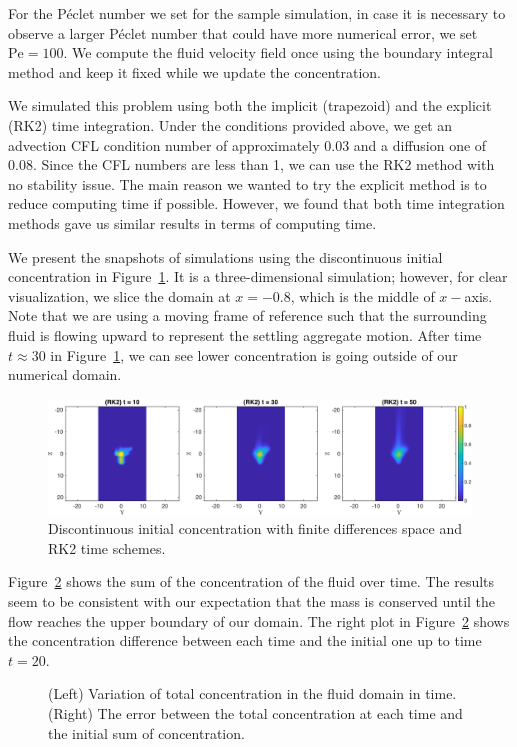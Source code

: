 For the Péclet number we set for the sample simulation, in case it is necessary to observe a larger Péclet number that could have more numerical error, we set $\text{Pe} = 100$.
We compute the fluid velocity field once using the boundary integral method and keep it fixed while we update the concentration. 
\par
We simulated this problem using both the implicit (trapezoid) and the explicit (RK2) time integration. Under the conditions provided above, we get an advection CFL condition number of approximately 0.03 and a diffusion one of 0.08. Since the CFL numbers are less than 1, we can use the RK2 method with no stability issue. 
The main reason we wanted to try the explicit method is to reduce computing time if possible. However, we found that both time integration methods gave us similar results in terms of computing time.
\par
We present the snapshots of simulations using the discontinuous initial concentration in Figure~\ref{fig_ic4_RK2_snap135}. It is a three-dimensional simulation; however, for clear visualization, we slice the domain at $x= -0.8$, which is the middle of $x-$axis.
 Note that we are using a moving frame of reference such that the surrounding fluid is flowing upward to represent the settling aggregate motion.
After time $t \approx 30$ in Figure~\ref{fig_ic4_RK2_snap135}, we can see lower concentration is going outside of our numerical domain.  
 \begin{figure}[h]
 \begin{center}
	\includegraphics[scale=0.75]{./figures/fig_ic4_RK2_snap135}
 \end{center}
 \caption{Discontinuous initial concentration with finite differences space and RK2 time schemes.}
 \label{fig_ic4_RK2_snap135}
 \end{figure}
 
Figure~\ref{fig_sumC} shows the sum of the concentration of the fluid over time.
The results seem to be consistent with our expectation that the mass is conserved until the flow reaches the upper boundary of our domain. The right plot in Figure~\ref{fig_sumC} shows the concentration difference between each time and the initial one up to time $t = 20$. 
 \begin{figure}[ht]
 \begin{center}
 \end{center}
 \caption{(Left) Variation of total concentration in the fluid domain in time. (Right) The error between the total concentration at each time and the initial sum of concentration.}
 \label{fig_sumC}
 \end{figure}
